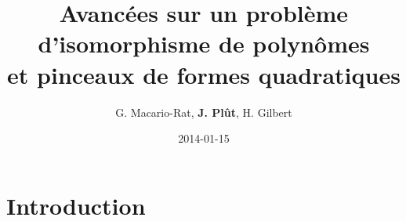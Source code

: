 \documentclass{beamer}%
\begin{document}
\section{Introduction}
\title[IP1S]%
  {Avancées sur un problème d'isomorphisme de polynômes\\
  et pinceaux de formes quadratiques}
\author{G. Macario-Rat, \textbf{J. Plût}, H.
Gilbert}
\date{2014-01-15}
%
\end{document}
